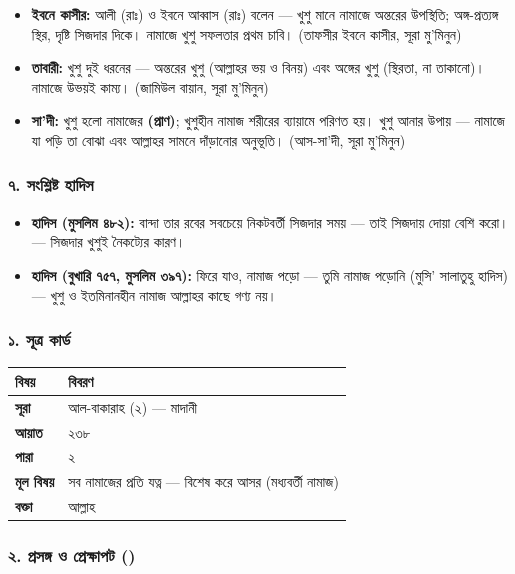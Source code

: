 \begin{itemize}
\item \textbf{ইবনে কাসীর:} আলী (রাঃ) ও ইবনে আব্বাস (রাঃ) বলেন — খুশু মানে নামাজে অন্তরের উপস্থিতি; অঙ্গ-প্রত্যঙ্গ স্থির, দৃষ্টি সিজদার দিকে। নামাজে খুশু সফলতার প্রথম চাবি। (তাফসীর ইবনে কাসীর, সূরা মু'মিনুন)
\item \textbf{তাবারী:} খুশু দুই ধরনের — অন্তরের খুশু (আল্লাহর ভয় ও বিনয়) এবং অঙ্গের খুশু (স্থিরতা, না তাকানো)। নামাজে উভয়ই কাম্য। (জামিউল বায়ান, সূরা মু'মিনুন)
\item \textbf{সা'দী:} খুশু হলো নামাজের \textbf{ (প্রাণ)}; খুশুহীন নামাজ শরীরের ব্যায়ামে পরিণত হয়। খুশু আনার উপায় — নামাজে যা পড়ি তা বোঝা এবং আল্লাহর সামনে দাঁড়ানোর অনুভূতি। (আস-সা'দী, সূরা মু'মিনুন)
\end{itemize}
\subsubsection*{৭. সংশ্লিষ্ট হাদিস}

\begin{itemize}
\item \textbf{হাদিস (মুসলিম ৪৮২):} বান্দা তার রবের সবচেয়ে নিকটবর্তী সিজদার সময় — তাই সিজদায় দোয়া বেশি করো। — সিজদার খুশুই নৈকট্যের কারণ।
\item \textbf{হাদিস (বুখারি ৭৫৭, মুসলিম ৩৯৭):} ফিরে যাও, নামাজ পড়ো — তুমি নামাজ পড়োনি (মুসি' সালাতুহু হাদিস) — খুশু ও ইতমিনানহীন নামাজ আল্লাহর কাছে গণ্য নয়।
\end{itemize}
\subsubsection*{১. সূত্র কার্ড}

\begin{table}[h]\centering\small
\begin{tabular}{ll}
বিষয় & বিবরণ \\
\hline
\textbf{সূরা} & আল-বাকারাহ (২) — মাদানী \\
\textbf{আয়াত} & ২৩৮ \\
\textbf{পারা} & ২ \\
\textbf{মূল বিষয়} & সব নামাজের প্রতি যত্ন — বিশেষ করে আসর (মধ্যবর্তী নামাজ) \\
\textbf{বক্তা} & আল্লাহ \\
\hline
\end{tabular}
\end{table}

\subsubsection*{২. প্রসঙ্গ ও প্রেক্ষাপট ()}

